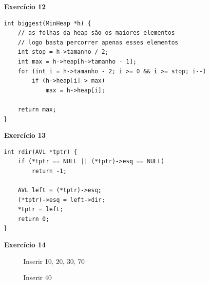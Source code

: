 \documentclass[a4paper,11pt]{article}
\begin{document}
\newpage

\noindent \textbf{Exercício 12}

\begin{verbatim}
int biggest(MinHeap *h) {
	// as folhas da heap são os maiores elementos
	// logo basta percorrer apenas esses elementos
	int stop = h->tamanho / 2;
	int max = h->heap[h->tamanho - 1];
	for (int i = h->tamanho - 2; i >= 0 && i >= stop; i--)
		if (h->heap[i] > max)
			max = h->heap[i];
	
	return max;
}
\end{verbatim}

\noindent \textbf{Exercício 13}

\begin{verbatim}
int rdir(AVL *tptr) {
	if (*tptr == NULL || (*tptr)->esq == NULL)
		return -1;
	
	AVL left = (*tptr)->esq;
	(*tptr)->esq = left->dir;
	*tptr = left;
	return 0;
}
\end{verbatim}

\noindent \textbf{Exercício 14}

\begin{figure}[H]
	\centering
	\caption{Inserir 10, 20, 30, 70}
\end{figure}

\begin{figure}[H]
	\centering
	\caption{Inserir 40}
\end{figure}
\end{document}
